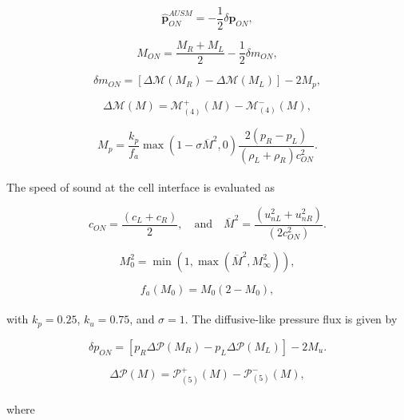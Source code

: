 \documentclass[a5paper]{sapthesis}
\begin{document}
	\begin{equation}
		\mathbf{\hat{p}}_{ON}^{AUSM} = -\frac{1}{2} \delta \mathbf{p}_{ON},
	\end{equation}
	
	\begin{equation}
		M_{ON} = \frac{M_R + M_L}{2} - \frac{1}{2} \delta m_{ON},
	\end{equation}
	
	\begin{equation}
		\delta m_{ON} = \left[ \Delta \mathcal{M}(M_R) - \Delta \mathcal{M}(M_L) \right] - 2M_p,
	\end{equation}
	
	\begin{equation}
		\Delta \mathcal{M}(M) = \mathcal{M}_{(4)}^+ (M) - \mathcal{M}_{(4)}^- (M),
	\end{equation}
	
	\begin{equation}
		M_p = \frac{k_p}{f_a} \max \left( 1 - \sigma \overline{M}^2, 0 \right) \frac{2(p_R - p_L)}{(\rho_L + \rho_R) c_{ON}^2}.
	\end{equation}
	\\
	The speed of sound at the cell interface is evaluated as 
	
	\begin{equation}
		c_{ON} = \frac{(c_L + c_R)}{2}, \quad \text{and} \quad \overline{M}^2 = \frac{(u_{nL}^2 + u_{nR}^2)}{(2c_{ON}^2)}.
	\end{equation}
	
	\begin{equation}
		M_0^2 = \min(1, \max(\overline{M}^2, M_{\infty}^2)),
	\end{equation}
	
	\begin{equation}
		f_a (M_0) = M_0 (2 - M_0),
	\end{equation}
	\\
	with $ k_p = 0.25 $, $ k_u = 0.75 $, and $ \sigma = 1 $.
	The diffusive-like pressure flux is given by
	
	\begin{equation}
		\delta p_{ON} = \left[ p_R \Delta \mathcal{P}(M_R) - p_L \Delta \mathcal{P}(M_L) \right] - 2M_u.
	\end{equation}
	
	\begin{equation}
		\Delta \mathcal{P}(M) = \mathcal{P}_{(5)}^+ (M) - \mathcal{P}_{(5)}^- (M),
	\end{equation}
	\\
	where
	
\end{document}
